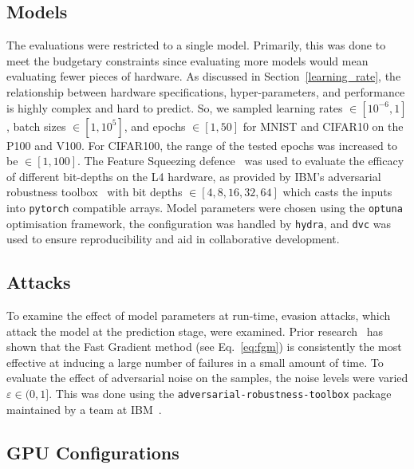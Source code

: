 \documentclass[conference]{IEEEtran}
\begin{document}
\subsection{Models}

The evaluations were restricted to a single model. Primarily, this was done to meet the budgetary constraints since evaluating more models would mean evaluating fewer pieces of hardware. As discussed in Section~\ref{learning_rate}, the relationship between hardware specifications, hyper-parameters, and performance is highly complex and hard to predict. So, we sampled learning rates $\in [10^{-6}, 1]$, batch sizes $\in [1, 10^5]$, and epochs $\in [1, 50]$ for MNIST and CIFAR10 on the P100 and V100. For CIFAR100, the range of the tested epochs was increased to be $\in [1, 100]$. The Feature Squeezing defence~\cite{feature_squeezing} was used to evaluate the efficacy of different bit-depths on the L4 hardware, as provided by IBM's adversarial robustness toolbox~\cite{art2018} with bit depths $\in [4,8,16,32,64]$ which casts the inputs into \texttt{pytorch} compatible arrays. Model parameters were chosen using the \texttt{optuna} optimisation framework, the configuration was handled by \texttt{hydra}, and \texttt{dvc} was used to ensure reproducibility and aid in collaborative development.


\subsection{Attacks}

To examine the effect of model parameters at run-time, evasion attacks, which attack the model at the prediction stage, were examined. Prior research~\cite{meyers,meyers_aft} has shown that the Fast Gradient method (see Eq.~\ref{eq:fgm}) is consistently the most effective at inducing a large number of failures in a small amount of time. To evaluate the effect of adversarial noise on the samples, the noise levels were varied $\varepsilon \in (0, 1]$. This was done using the \texttt{adversarial-robustness-toolbox} package maintained by a team at IBM~\cite{art2018}.


\subsection{GPU Configurations}
\end{document}
